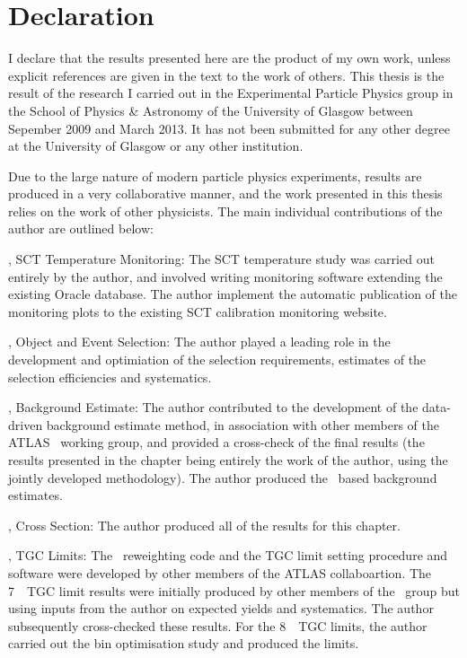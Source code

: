 \chapter*{Declaration}
I declare that the results presented here are the product of my own work, unless
explicit references are given in the text to the work of others. This thesis is
the result of the research I carried out in the Experimental Particle Physics
group in the School of Physics \& Astronomy of the University of Glasgow between
Sepember 2009 and March 2013. It has not been submitted for any other degree
at the University of Glasgow or any other institution.

Due to the large nature of modern particle physics experiments, results are produced in a very collaborative
manner, and the work presented in this thesis relies on the work of other
physicists. The main individual contributions of the author are outlined below:

, SCT Temperature Monitoring: The SCT temperature study was
carried out entirely by the author, and involved writing monitoring software
extending the existing Oracle database. The author implement the automatic
publication of the monitoring plots to the existing SCT calibration monitoring
website.

, Object and Event Selection: The author played a
leading role in the development and optimiation of the selection requirements,
estimates of the selection efficiencies and systematics.

, Background Estimate: The author contributed to the 
development of the data-driven background estimate method, in association with other members
of the ATLAS \ZZ\ working group, and provided a cross-check of the final
results (the results presented in the chapter being entirely the work of the
author, using the jointly developed methodology). The author produced the \mc\ based background estimates.

, Cross Section: The author produced all of the results for
this chapter.

, TGC Limits: The \AfterBurner\ reweighting code and the TGC
limit setting procedure and software were developed by other members of the
ATLAS collaboartion. The 7~\tev\ TGC limit results were initially produced by
other members of the \ZZ\ group but using inputs from the author on expected
yields and systematics. The author subsequently cross-checked these results. For
the 8~\tev\ TGC limits, the author carried out the bin optimisation study and
produced the limits.
